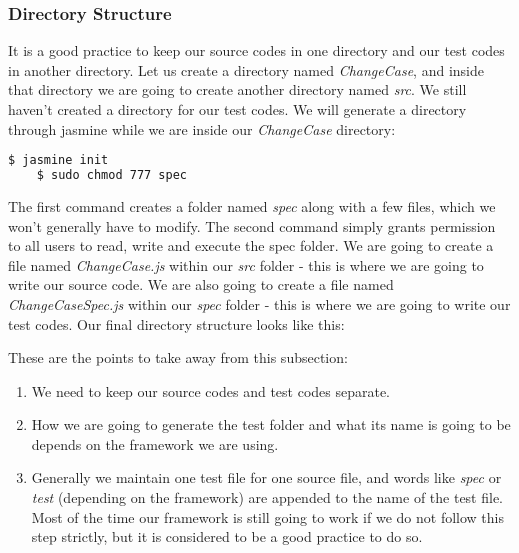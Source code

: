 \documentclass{article}
\begin{document}
\subsubsection{Directory Structure}
It is a good practice to keep our source codes in one directory and our test codes in another directory.
Let us create a directory named \textit{ChangeCase}, and inside that directory we are going to create another directory named \textit{src}.
We still haven't created a directory for our test codes. 
We will generate a directory through jasmine while we are inside our \textit{ChangeCase} directory:
\begin{lstlisting}[language=bash]
	$ jasmine init
	$ sudo chmod 777 spec
\end{lstlisting}
The first command creates a folder named \textit{spec} along with a few files, which we won't generally have to modify. 
The second command simply grants permission to all users to read, write and execute the spec folder.
We are going to create a file named \textit{ChangeCase.js} within our \textit{src} folder - this is where we are
going to write our source code.
We are also going to create a file named \textit{ChangeCaseSpec.js} within our \textit{spec} folder - this is where we are
going to write our test codes.
Our final directory structure looks like this: \\


These are the points to take away from this subsection:
\begin{enumerate}
	\item We need to keep our source codes and test codes separate.
	\item How we are going to generate the test folder and what its name is going to be depends on the framework we are using.
	\item Generally we maintain one test file for one source file, and words like \textit{spec} or \textit{test}
		(depending on the framework) are appended to the name of the test file.
		Most of the time our framework is still going to work if we do not follow this step strictly, 
		but it is considered to be a good practice to do so.
\end{enumerate}
\end{document}
